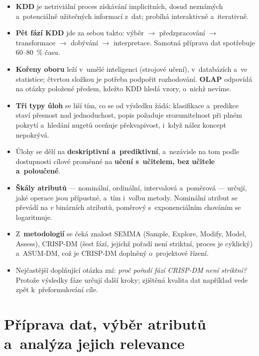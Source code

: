 \documentclass[11pt,a4paper]{article}
\theoremstyle{definition}
\begin{document}
\begin{itemize}
\item \textbf{KDD} je netriviální proces získávání implicitních, dosud neznámých
      a~potenciálně užitečných informací z~dat; probíhá interaktivně a~iterativně.
\item \textbf{Pět fází KDD} jde za sebou takto: výběr $\to$ předzpracování $\to$
      transformace $\to$ dobývání $\to$ interpretace. Samotná příprava dat spotřebuje
      60--80~\% času.
\item \textbf{Kořeny oboru} leží v~umělé inteligenci (strojové učení), v~databázích
      a~ve statistice; čtvrtou složkou je potřeba podpořit rozhodování. \textbf{OLAP}
      odpovídá na otázky položené předem, kdežto KDD hledá vzory, o~nichž nevíme.
\item \textbf{Tři typy úloh} se liší tím, co se od výsledku žádá: klasifikace a~predikce
      staví přesnost nad jednoduchost, popis požaduje srozumitelnost při plném pokrytí
      a~hledání nugetů oceňuje překvapivost, i~když nález koncept nepokrývá.
\item Úlohy se dělí na \textbf{deskriptivní a~prediktivní}, a~nezávisle na tom podle
      dostupnosti cílové proměnné na \textbf{učení s~učitelem, bez učitele a~poloučené}.
\item \textbf{Škály atributů} --- nominální, ordinální, intervalová a~poměrová --- určují,
      jaké operace jsou přípustné, a~tím i~volbu metody. Nominální atribut se převádí na
      $v$ binárních atributů, poměrový s~exponenciálním chováním se logaritmuje.
\item Z~\textbf{metodologií} se čeká znalost SEMMA (Sample, Explore, Modify, Model,
      Assess), CRISP-DM (šest fází, jejichž pořadí není striktní, proces je cyklický)
      a~ASUM-DM, což je CRISP-DM doplněný o~projektové řízení.
\item Nejčastější doplňující otázka zní: \emph{proč pořadí fází CRISP-DM není striktní?}
      Protože výsledky fáze určují další kroky; zjištěná kvalita dat například vede zpět
      k~přeformulování cíle.
\end{itemize}

\newpage

\section{Příprava dat, výběr atributů a~analýza jejich relevance}
\label{sec:priprava}
\end{document}
